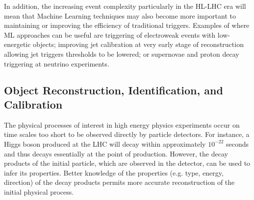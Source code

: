 In addition, the increasing event complexity particularly in the HL-LHC era will mean that Machine Learning techniques may also become more important to maintaining or improving the efficiency of traditional triggers. Examples of where ML approaches can be useful are triggering of electroweak events with low-energetic objects; improving jet calibration at very early stage of reconstruction allowing jet triggers thresholds to be lowered; or supernovae and proton decay triggering at neutrino experiments.



\subsection{Object Reconstruction, Identification, and Calibration}
\label{sec:object-reco-id-calib}


The physical processes of interest in high energy physics experiments occur on time scales too short to be observed directly by particle detectors. For instance, a Higgs boson produced at the LHC will decay within approximately $10^{-22}$ seconds and thus decays essentially at the point of production. However, the decay products of the initial particle, which are observed in the detector, can be used to infer its properties. Better knowledge of the properties (e.g. type, energy, direction) of the decay products permits more accurate reconstruction of the initial physical process.\medskip

